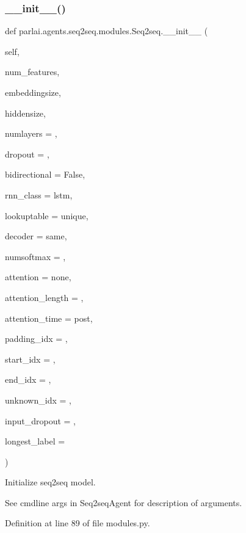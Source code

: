 \subsubsection{\texorpdfstring{\+\_\+\+\_\+init\+\_\+\+\_\+()}{\_\_init\_\_()}}
{\footnotesize\ttfamily def parlai.\+agents.\+seq2seq.\+modules.\+Seq2seq.\+\_\+\+\_\+init\+\_\+\+\_\+ (\begin{DoxyParamCaption}\item[{}]{self,  }\item[{}]{num\+\_\+features,  }\item[{}]{embeddingsize,  }\item[{}]{hiddensize,  }\item[{}]{numlayers = {},  }\item[{}]{dropout = {},  }\item[{}]{bidirectional = {\ttfamily False},  }\item[{}]{rnn\+\_\+class = {\ttfamily \textquotesingle{}lstm\textquotesingle{}},  }\item[{}]{lookuptable = {\ttfamily \textquotesingle{}unique\textquotesingle{}},  }\item[{}]{decoder = {\ttfamily \textquotesingle{}same\textquotesingle{}},  }\item[{}]{numsoftmax = {},  }\item[{}]{attention = {\ttfamily \textquotesingle{}none\textquotesingle{}},  }\item[{}]{attention\+\_\+length = {},  }\item[{}]{attention\+\_\+time = {\ttfamily \textquotesingle{}post\textquotesingle{}},  }\item[{}]{padding\+\_\+idx = {},  }\item[{}]{start\+\_\+idx = {},  }\item[{}]{end\+\_\+idx = {},  }\item[{}]{unknown\+\_\+idx = {},  }\item[{}]{input\+\_\+dropout = {},  }\item[{}]{longest\+\_\+label = {} }\end{DoxyParamCaption})}

\begin{DoxyVerb}Initialize seq2seq model.

See cmdline args in Seq2seqAgent for description of arguments.
\end{DoxyVerb}
 

Definition at line 89 of file modules.\+py.


